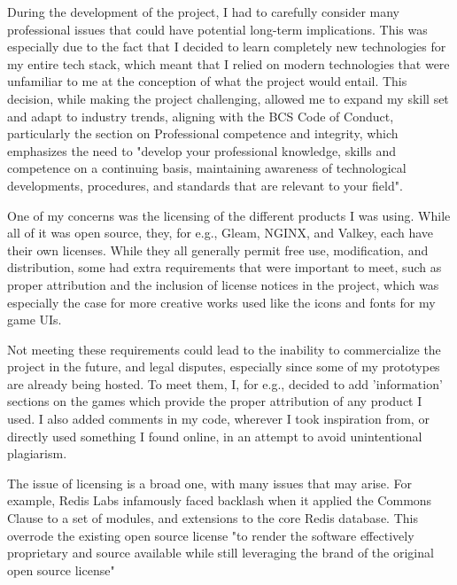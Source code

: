 \documentclass[]{final}
\begin{document}
During the development of the project, I had to carefully consider many
professional issues that could have potential long-term implications.
This was especially due to the fact that I decided to learn completely
new technologies for my entire tech stack, which meant that I relied
on modern technologies that were unfamiliar to me at the conception of what
the project would entail. This decision, while making the project challenging,
allowed me to expand my skill set and adapt to industry trends,
aligning with the BCS Code of Conduct, particularly the section on
Professional competence and integrity, which emphasizes the need to
"develop your professional knowledge, skills and competence on a continuing
basis, maintaining awareness of technological developments, procedures,
and standards that are relevant to your field".


One of my concerns was the licensing of the different products I was using.
While all of it was open source, they, for e.g., Gleam, NGINX, and Valkey,
each have their own licenses.
While they all generally permit free use, modification, and distribution,
some had extra requirements that were important to meet,
such as proper attribution and the inclusion of license notices in
the project, which was especially the case for more creative works used
like the icons and fonts for my game UIs.

Not meeting these requirements
could lead to the inability to commercialize the project
in the future, and legal disputes, especially since some of my prototypes are
already being hosted. To meet them, I, for e.g., decided to add 'information' sections on
the games which provide the proper attribution of any product I used. I
also added comments in my code, wherever I took inspiration from, or directly
used something I found online, in an attempt to avoid unintentional plagiarism.


The issue of licensing is a broad one, with many issues that may arise.
For example, Redis Labs infamously faced backlash when it applied
the Commons Clause to a set of modules, and extensions to the core Redis database.
This overrode the existing open source license "to render the
software effectively proprietary and source available while still leveraging
the brand of the original open source license"
\end{document}
